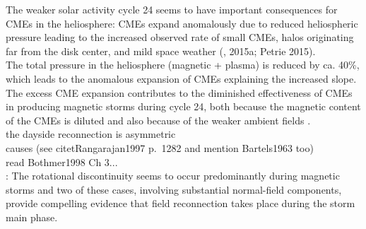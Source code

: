 The weaker solar activity cycle 24 seems to have important consequences for CMEs in the heliosphere: CMEs expand anomalously due to reduced heliospheric pressure leading to the increased observed rate of small CMEs, halos originating far from the disk center, and mild space weather (\citep{Gopalswamy2014}, 2015a; Petrie 2015).\\
The total pressure in the heliosphere (magnetic + plasma) is reduced by ca. 40\%, which leads to the anomalous expansion of CMEs explaining the increased slope. The excess CME expansion contributes to the diminished effectiveness of CMEs in producing magnetic storms during cycle 24, both because the magnetic content of the CMEs is diluted and also because of the weaker ambient fields \citep{Gopalswamy2014}.\\

the dayside reconnection is asymmetric\\

causes (see citet{Rangarajan1997} p.~1282 and mention Bartels1963 too)\\
read Bothmer1998 Ch 3...\\


\citet{Sonnerup1967}: The rotational discontinuity seems to occur predominantly during magnetic storms and two of these cases, involving substantial normal-field components, provide compelling evidence that field reconnection takes place during the storm main phase.\\



